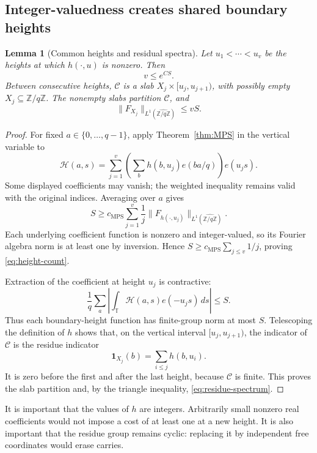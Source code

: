 \documentclass[11pt,reqno]{amsart}
\numberwithin{equation}{section}
\newtheorem{lemma}[theorem]{Lemma}
\theoremstyle{definition}
\theoremstyle{remark}
\newcommand{\Z}{\mathbb Z}
\newcommand{\T}{\mathbb T}
\newcommand{\one}{\mathbf 1}
\newcommand{\norm}[1]{\lVert#1\rVert}
\newcommand{\cMPS}{c_{\mathrm{MPS}}}
\begin{document}
\subsection{Integer-valuedness creates shared boundary heights}

\begin{lemma}[Common heights and residual spectra]\label{lem:heights}
Let $u_1<\cdots<u_v$ be the heights at which $h(\cdot,u)$ is nonzero.
Then
\begin{equation}\label{eq:height-count}
 v\le e^{CS}.
\end{equation}
Between consecutive heights, $\mathcal C$ is a slab
$X_j\times[u_j,u_{j+1})$, with possibly empty
$X_j\subseteq\Z/q\Z$. The nonempty slabs partition $\mathcal C$, and
\begin{equation}\label{eq:residue-spectrum}
 \norm{F_{X_j}}_{L^1(\widehat{\Z/q\Z})}\le vS.
\end{equation}
\end{lemma}
\begin{proof}
For fixed $a\in\{0,\ldots,q-1\}$, apply
Theorem~\ref{thm:MPS} in the vertical variable to
\[
 \mathscr H(a,s)=\sum_{j=1}^v
 \left(\sum_bh(b,u_j)e(ba/q)\right)e(u_js).
\]
Some displayed coefficients may vanish; the weighted inequality remains
valid with the original indices. Averaging over $a$ gives
\[
 S\ge\cMPS\sum_{j=1}^v\frac1j
       \norm{F_{h(\cdot,u_j)}}_{L^1(\widehat{\Z/q\Z})}.
\]
Each underlying coefficient function is nonzero and integer-valued, so
its Fourier algebra norm is at least one by inversion. Hence
$S\ge\cMPS\sum_{j\le v}1/j$, proving \eqref{eq:height-count}.

Extraction of the coefficient at height $u_j$ is contractive:
\[
 \frac1q\sum_a\left|\int_\T\mathscr H(a,s)e(-u_js)\,ds\right|
 \le S.
\]
Thus each boundary-height function has finite-group norm at most $S$.
Telescoping the definition of $h$ shows that, on the vertical interval
$[u_j,u_{j+1})$, the indicator of $\mathcal C$ is the residue indicator
\[
 \one_{X_j}(b)=\sum_{i\le j}h(b,u_i).
\]
It is zero before the first and after the last height, because
$\mathcal C$ is finite. This proves the slab partition and, by the
triangle inequality, \eqref{eq:residue-spectrum}.
\end{proof}

It is important that the values of $h$ are integers. Arbitrarily small
nonzero real coefficients would not impose a cost of at least one at a
new height. It is also important that the residue group remains cyclic:
replacing it by independent free coordinates would erase carries.
\end{document}
